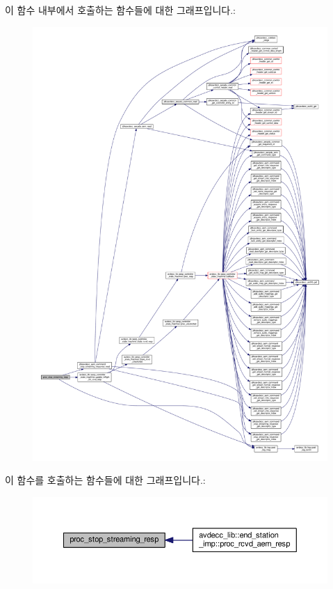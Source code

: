 이 함수 내부에서 호출하는 함수들에 대한 그래프입니다.\+:
\nopagebreak
\begin{figure}[H]
\begin{center}
\leavevmode
\includegraphics[width=350pt]{classavdecc__lib_1_1stream__input__descriptor__imp_a68bca93326a78c7c727b621208e3c804_cgraph}
\end{center}
\end{figure}




이 함수를 호출하는 함수들에 대한 그래프입니다.\+:
\nopagebreak
\begin{figure}[H]
\begin{center}
\leavevmode
\includegraphics[width=350pt]{classavdecc__lib_1_1stream__input__descriptor__imp_a68bca93326a78c7c727b621208e3c804_icgraph}
\end{center}
\end{figure}


